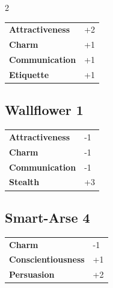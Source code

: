 \begin{multicols}{2}
\begin{tcolorbox}
\vspace{3mm}

\begin{tabular}{@{}ll@{}}
    \textbf{Attractiveness} & +2\\
    \textbf{Charm} & +1\\
    \textbf{Communication} & +1\\
    \textbf{Etiquette} & +1\\
\end{tabular}


\end{tcolorbox}

\begin{tcolorbox}
    \subsection*{Wallflower \hfill \small{1 }}
    \tcblower




\begin{tabular}{@{}ll@{}}
    \textbf{Attractiveness} & -1\\
    \textbf{Charm} & -1\\
    \textbf{Communication} & -1\\
    \textbf{Stealth} & +3\\
\end{tabular}


\end{tcolorbox}

\begin{tcolorbox}
    \subsection*{Smart-Arse \hfill \small{4 }}
    \tcblower




\begin{tabular}{@{}ll@{}}
    \textbf{Charm} & -1\\
    \textbf{Conscientiousness} & +1\\
    \textbf{Persuasion} & +2\\
\end{tabular}


\end{tcolorbox}
\end{multicols}
